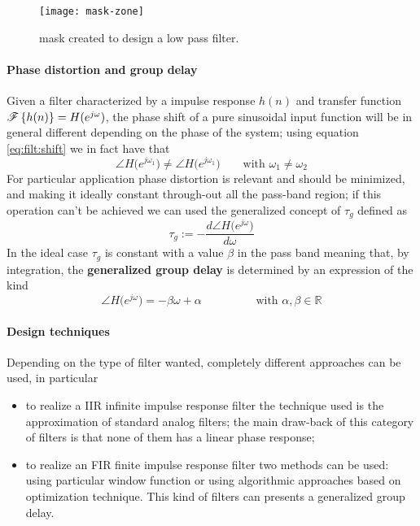 	\begin{SCfigure}[2][bht]
		\centering \texttt{[image: mask-zone]}
		\caption{mask created to design a low pass filter.}
		\label{fig:filt:mask}
	\end{SCfigure}
	
	\paragraph{Phase distortion and group delay} Given a filter characterized by a impulse response $h(n)$ and transfer function $\mathscr{F}\left\{ h(n) \right\} = H(e^{j\omega})$, the phase shift of a pure sinusoidal input function will be in general different depending on the phase of the system; using equation \ref{eq:filt:shift} we in fact have that
	\[ \angle H\big(e^{j\omega_1}\big) \neq \angle H\big(e^{j\omega_1}\big) \qquad \textrm{with } \omega_1 \neq \omega_2 \]
	For particular application phase distortion is relevant and should be minimized, and making it ideally constant through-out all the pass-band region; if this operation can't be achieved we can used the generalized concept of  $\tau_g$ defined as
	\begin{equation}
		\tau_g := - \frac{d\angle H \big(e^{j\omega}\big)}{d\omega}
	\end{equation}
	In the ideal case $\tau_g$ is constant with a value $\beta$ in the pass band meaning that, by integration, the \textbf{generalized group delay} is determined by an expression of the kind
	\[ \angle H\big(e^{j\omega}\big) = -\beta \omega + \alpha \hspace{2cm} \textrm{with } \alpha,\beta \in \mathds R \]
	
	\paragraph{Design techniques} Depending on the type of filter wanted, completely different approaches can be used, in particular
	\begin{itemize}
		\item to realize a IIR infinite impulse response filter the technique used is the approximation of standard analog filters; the main draw-back of this category of filters is that none of them has a linear phase response;		
		\item to realize an FIR finite impulse response filter two methods can be used: using particular window function or using algorithmic approaches based on optimization technique. This kind of filters can presents a generalized group delay.
	\end{itemize}

